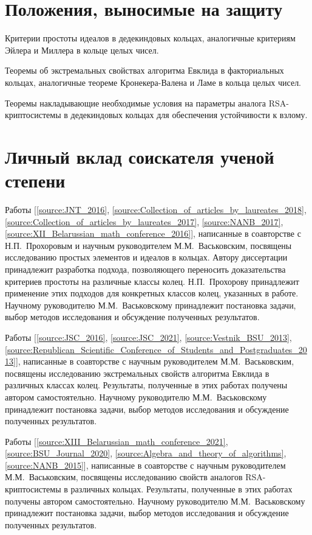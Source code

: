 \documentclass[_00_dissertation.tex]{subfiles}
\begin{document}
\section*{Положения, выносимые на защиту}

Критерии простоты идеалов в дедекиндовых кольцах, аналогичные критериям Эйлера и Миллера в кольце целых чисел.

Теоремы об экстремальных свойствах алгоритма Евклида в факториальных кольцах, аналогичные теореме Кронекера-Валена и Ламе в кольца целых чисел.

Теоремы накладывающие необходимые условия на параметры аналога RSA-криптосистемы в дедекиндовых кольцах для обеспечения устойчивости к взлому.

\section*{Личный вклад соискателя ученой степени}

Работы [\ref{source:JNT_2016}, \ref{source:Collection_of_articles_by_laureates_2018}, \ref{source:Collection_of_articles_by_laureates_2017}, \ref{source:NANB_2017}, \ref{source:XII_Belarussian_math_conference_2016}], написанные в соавторстве с Н.П.~Прохоровым и научным руководителем М.М.~Васьковским, посвящены исследованию простых элементов и идеалов в кольцах.
Автору диссертации принадлежит разработка подхода, позволяющего переносить доказательства критериев простоты на различные классы колец.
Н.П.~Прохорову принадлежит применение этих подходов для конкретных классов колец, указанных в работе.
Научному руководителю М.М.~Васьковскому принадлежит постановка задачи, выбор методов исследования и обсуждение полученных результатов.

Работы [\ref{source:JSC_2016}, \ref{source:JSC_2021}, \ref{source:Vestnik_BSU_2013}, \ref{source:Republican_Scientific_Conference_of_Students_and_Postgraduates_2013}], написанные в соавторстве с научным руководителем М.М.~Васьковским, посвящены исследованию экстремальных свойств алгоритма Евклида в различных  классах колец.
Результаты, полученные  в этих работах получены  автором самостоятельно.
Научному руководителю М.М.~Васьковскому принадлежит постановка задачи, выбор методов исследования и обсуждение полученных результатов.

Работы [\ref{source:XIII_Belarussian_math_conference_2021}, \ref{source:BSU_Journal_2020}, \ref{source:Algebra_and_theory_of_algorithms}, \ref{source:NANB_2015}], написанные в соавторстве с научным руководителем М.М.~Васьковским, посвящены исследованию свойств аналогов RSA-криптосистемы в различных кольцах.
Результаты, полученные  в этих работах получены  автором самостоятельно.
Научному руководителю М.М.~Васьковскому принадлежит постановка задачи, выбор методов исследования и обсуждение полученных результатов.
\end{document}
